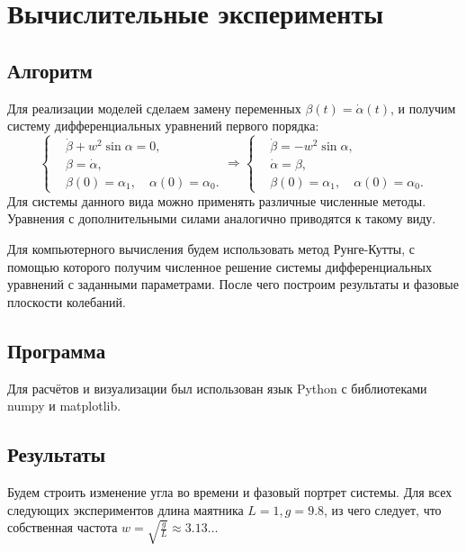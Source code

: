 \section{Вычислительные эксперименты}

    \subsection{Алгоритм}
        Для реализации моделей сделаем замену переменных \( \beta(t) = \dot{\alpha}(t) \), и получим систему дифференциальных уравнений первого порядка:
        \[
            \begin{cases}
                & \dot{\beta} + w^2 \sin \alpha = 0, \\
                & \beta = \dot{\alpha}, \\
                & \beta(0) = \alpha_1, \quad \alpha(0) = \alpha_0.
            \end{cases} \Rightarrow
            \begin{cases}
                & \dot{\beta} = - w^2 \sin \alpha, \\
                & \dot{\alpha} = \beta, \\
                & \beta(0) = \alpha_1, \quad \alpha(0) = \alpha_0.
            \end{cases}
        \]
        Для системы данного вида можно применять различные численные методы. Уравнения с дополнительными силами аналогично приводятся к такому виду.

        Для компьютерного вычисления будем использовать метод Рунге-Кутты, с помощью которого получим численное решение системы дифференциальных уравнений с заданными параметрами. После чего построим результаты и фазовые плоскости колебаний.



    \subsection{Программа}
        Для расчётов и визуализации был использован язык Python с библиотеками numpy и matplotlib.

        

    \subsection{Результаты}
        Будем строить изменение угла во времени и фазовый портрет системы. Для всех следующих экспериментов длина маятника $L = 1, g = 9.8$, из чего следует, что собственная частота $w = \sqrt{\frac{g}{L}} \approx 3.13\dots$
